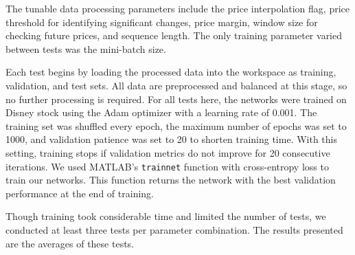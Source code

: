 \documentclass[a4paper,oneside,onecolumn,12pt]{book}
\begin{document}
	The tunable data processing parameters include the price interpolation flag, price threshold for identifying significant changes, price margin, window size for checking future prices, and sequence length. The only training parameter varied between tests was the mini-batch size.

	Each test begins by loading the processed data into the workspace as training, validation, and test sets. All data are preprocessed and balanced at this stage, so no further processing is required. For all tests here, the networks were trained on Disney stock using the Adam optimizer with a learning rate of 0.001. The training set was shuffled every epoch, the maximum number of epochs was set to 1000, and validation patience was set to 20 to shorten training time. With this setting, training stops if validation metrics do not improve for 20 consecutive iterations. We used MATLAB's \texttt{trainnet} function with cross-entropy loss to train our networks. This function returns the network with the best validation performance at the end of training.

	Though training took considerable time and limited the number of tests, we conducted at least three tests per parameter combination. The results presented are the averages of these tests.
\end{document}
